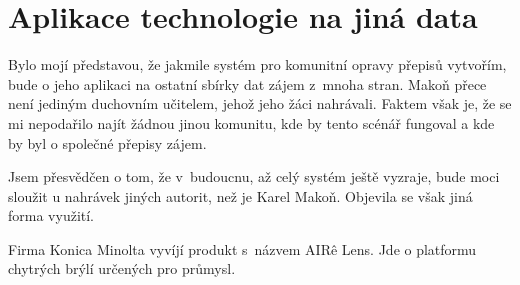 \chapter{Aplikace technologie na jiná data}
\label{kap:jina-data}

Bylo mojí představou, že jakmile systém pro komunitní opravy přepisů vytvořím,
bude o jeho aplikaci na ostatní sbírky dat zájem z~mnoha stran. Makoň přece není
jediným duchovním učitelem, jehož jeho žáci nahrávali. Faktem však je, že se mi
nepodařilo najít žádnou jinou komunitu, kde by tento scénář fungoval a kde by
byl o společné přepisy zájem.

Jsem přesvědčen o tom, že v~budoucnu, až celý systém ještě vyzraje, bude moci
sloužit u nahrávek jiných autorit, než je Karel Makoň. Objevila se však jiná
forma využití.

Firma Konica Minolta vyvíjí produkt s~názvem AIR\^{e} Lens. Jde o platformu
chytrých brýlí určených pro průmysl. 
